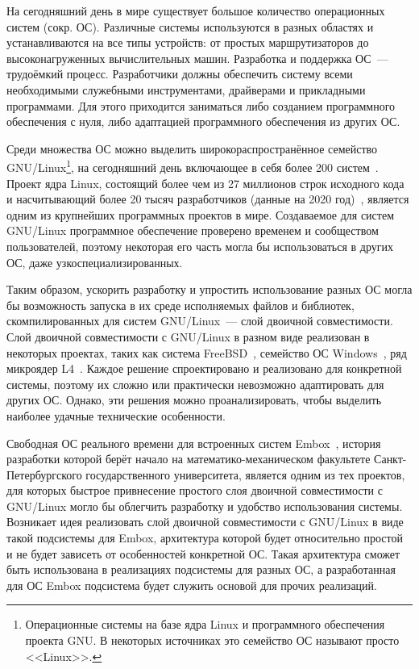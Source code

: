 
На сегодняшний день в мире существует большое количество операционных систем (сокр. ОС). Различные системы используются в разных областях и устанавливаются на все типы устройств: от простых маршрутизаторов до высоконагруженных вычислительных машин. Разработка и поддержка ОС~--- трудоёмкий процесс. Разработчики должны обеспечить систему всеми необходимыми служебными инструментами, драйверами и прикладными программами. Для этого приходится заниматься либо созданием программного обеспечения с нуля, либо адаптацией программного обеспечения из других ОС.

Среди множества ОС можно выделить широкораспространённое семейство GNU/Linux\footnote{Операционные системы на базе ядра Linux и программного обеспечения проекта GNU. В некоторых источниках это семейство ОС называют просто <<Linux>>.}, на сегодняшний день включающее в себя более 200 систем~\cite{distrowatch}. Проект ядра Linux, состоящий более чем из 27 миллионов строк исходного кода и насчитывающий более 20 тысяч разработчиков (данные на 2020 год)~\cite{linux-gitstats}, является одним из крупнейших программных проектов в мире. Создаваемое для систем GNU/Linux программное обеспечение проверено временем и сообществом пользователей, поэтому некоторая его часть могла бы использоваться в других ОС, даже узкоспециализированных.

Таким образом, ускорить разработку и упростить использование разных ОС могла бы возможность запуска в их среде исполняемых файлов и библиотек, скомпилированных для систем GNU/Linux~--- слой двоичной совместимости. Слой двоичной совместимости с GNU/Linux в разном виде реализован в некоторых проектах, таких как система FreeBSD~\cite{freebsd-docs-chapter11}\cite{freebsd-article-linux-emu}, семейство ОС Windows~\cite{wsl-overview}\cite{wsl-2-announce}, ряд микроядер L4~\cite{l4linux}. Каждое решение спроектировано и реализовано для конкретной системы, поэтому их сложно или практически невозможно адаптировать для других ОС. Однако, эти решения можно проанализировать, чтобы выделить наиболее удачные технические особенности.

Свободная ОС реального времени для встроенных систем Embox~\cite{embox}, история разработки которой берёт начало на математико-механическом факультете Санкт-Петербургского государственного университета, является одним из тех проектов, для которых быстрое привнесение простого слоя двоичной совместимости с GNU/Linux могло бы облегчить разработку и удобство использования системы. Возникает идея реализовать слой двоичной совместимости с GNU/Linux в виде такой подсистемы для Embox, архитектура которой будет относительно простой и не будет зависеть от особенностей конкретной ОС. Такая архитектура сможет быть использована в реализациях подсистемы для разных ОС, а разработанная для ОС Embox подсистема будет служить основой для прочих реализаций.

